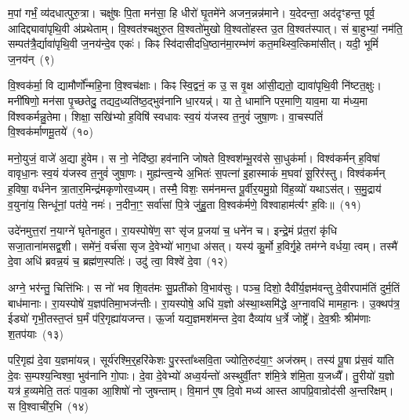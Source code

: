 म॒पां गर्भं॒ व्य॑दधात्पुरु॒त्रा। चक्षु॑षः पि॒ता मन॑सा॒ हि धीरो॑ घृ॒तमे॑ने अजन॒न्नन्न॑माने। य॒देदन्ता॒ अद॑दृꣳहन्त॒ पूर्व॒ आदिद्द्यावा॑\-पृथि॒वी अ॑प्रथेताम्। वि॒श्वत॑श्चक्षुरु॒त वि॒श्वतो॑मुखो वि॒श्वतो॑हस्त उ॒त वि॒श्वत॑स्पात्। सं बा॒हुभ्यां॒ नम॑ति॒ सम्पत॑त्रै॒र्द्यावा॑\-पृथि॒वी ज॒नय॑न्दे॒व एकः॑। किꣴ स्वि॑दासीदधि॒ष्ठान॑मा॒रम्भ॑णं कत॒मथ्स्वि॒त्किमा॑सीत्। यदी॒ भूमिं॑ ज॒नय॑न्~(९)\ip

वि॒श्वक॑र्मा॒ वि द्यामौर्णो᳚न्महि॒ना वि॒श्वच॑क्षाः। किꣴ स्वि॒द्वनं॒ क उ॒ स वृ॒क्ष आ॑सी॒द्यतो॒ द्यावा॑\-पृथि॒वी नि॑ष्टत॒क्षुः। मनी॑षिणो॒ मन॑सा पृ॒च्छतेदु॒ तद्यद॒ध्यति॑ष्ठ॒द्भुव॑नानि धा॒रयन्न्॑। या ते॒ धामा॑नि पर॒माणि॒ याव॒मा या म॑ध्य॒मा वि॑श्वकर्मन्नु॒तेमा। शिक्षा॒ सखि॑भ्यो ह॒विषि॑ स्वधावः स्व॒यं य॑जस्व त॒नुवं॑ जुषा॒णः। वा॒चस्पतिं॑ वि॒श्वक॑र्माणमू॒तये॑~(१०)\ip

मनो॒युजं॒ वाजे॑ अ॒द्या हु॑वेम। स नो॒ नेदि॑ष्ठा॒ हव॑नानि जोषते वि॒श्वश॑म्भू॒रव॑से सा॒धुक॑र्मा। विश्व॑कर्मन् ह॒विषा॑ वावृधा॒नः स्व॒यं य॑जस्व त॒नुवं॑ जुषा॒णः। मुह्य॑न्त्व॒न्ये अ॒भितः॑ स॒पत्ना॑ इ॒हास्माकं॑ म॒घवा॑ सू॒रिर॑स्तु। विश्व॑कर्मन् ह॒विषा॒ वर्ध॑नेन त्रा॒तार॒मिन्द्र॑मकृणोरव॒ध्यम्। तस्मै॒ विशः॒ सम॑नमन्त पू॒र्वीर॒यमु॒ग्रो वि॑ह॒व्यो॑ यथा\-ऽ\-स॑त्। स॒मु॒द्राय॑ व॒युना॑य॒ सिन्धू॑नां॒ पत॑ये॒ नमः॑। न॒दीना॒ꣳ॒ सर्वा॑सां पि॒त्रे जु॑हु॒ता वि॒श्वक॑र्मणे॒ विश्वाहाम॑र्त्यꣳ ह॒विः॥~(११)\ip

{\anuvakamend[{ज॒जानै॒नौष॑धीनां॒ भूमिं॑ ज॒नय॑न्नू॒तये॒ नमो॒ नव॑ च}]}

उदे॑नमुत्त॒रां न॒याग्ने॑ घृतेनाहुत। रा॒यस्पोषे॑ण॒ सꣳ सृ॑ज प्र॒जया॑ च॒ धने॑न च। इन्द्रे॒मं प्र॑त॒रां कृ॑धि सजा॒ताना॑मसद्व॒शी। समे॑नं॒ वर्च॑सा सृज दे॒वेभ्यो॑ भाग॒धा अ॑सत्। यस्य॑ कु॒र्मो ह॒विर्गृ॒हे तम॑ग्ने वर्धया॒ त्वम्। तस्मै॑ दे॒वा अधि॑ ब्रवन्न॒यं च॒ ब्रह्म॑ण॒स्पतिः॑। उदु॑ त्वा॒ विश्वे॑ दे॒वा~(१२)\ip

अग्ने॒ भर॑न्तु॒ चित्ति॑भिः। स नो॑ भव शि॒वत॑मः सु॒प्रती॑को वि॒भाव॑सुः। पञ्च॒ दिशो॒ दैवी᳚र्य॒ज्ञम॑वन्तु दे॒वीरपाम॑तिं दुर्म॒तिं बाध॑मानाः। रा॒यस्पोषे॑ य॒ज्ञप॑तिमा॒भज॑न्तीः। रा॒यस्पोषे॒ अधि॑ य॒ज्ञो अ॑स्था॒थ्समि॑द्धे अ॒ग्नावधि॑ मामहा॒नः। उ॒क्थप॑त्र॒ ईड्यो॑ गृभी॒तस्त॒प्तं घ॒र्मं प॑रि॒गृह्या॑यजन्त। ऊ॒र्जा यद्य॒ज्ञमश॑मन्त दे॒वा दैव्या॑य ध॒र्त्रे जोष्ट्रे᳚। दे॒व॒श्रीः श्रीम॑णाः श॒तप॑याः~(१३)\ip

परि॒गृह्य॑ दे॒वा य॒ज्ञमा॑यन्न्। सूर्य॑रश्मि॒र्॒\mbox{}हरि॑केशः पु॒रस्ता᳚थ्सवि॒ता ज्योति॒रुद॑या॒ꣳ॒ अज॑स्रम्। तस्य॑ पू॒षा प्र॑स॒वं या॑ति दे॒वः स॒म्पश्य॒न्विश्वा॒ भुव॑नानि गो॒पाः। दे॒वा दे॒वेभ्यो॑ अध्व॒र्यन्तो॑ अस्थुर्वी॒तꣳ श॑मि॒त्रे श॑मि॒ता य॒जध्यै᳚। तु॒रीयो॑ य॒ज्ञो यत्र॑ ह॒व्यमेति॒ ततः॑ पाव॒का आ॒शिषो॑ नो जुषन्ताम्। वि॒मान॑ ए॒ष दि॒वो मध्य॑ आस्त आपप्रि॒वान्रोद॑सी अ॒न्तरि॑क्षम्। स वि॒श्वाची॑र॒भि~(१४)\ip

